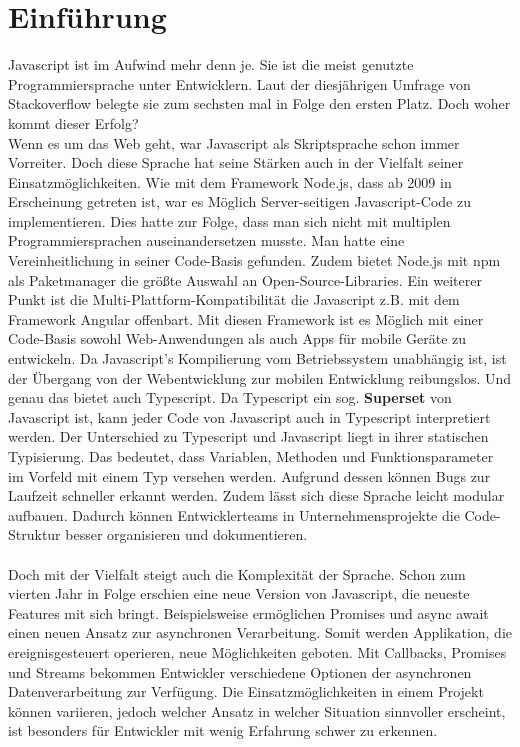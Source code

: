 \setcounter{secnumdepth}{1}

\section{Einführung}

Javascript ist im Aufwind mehr denn je. Sie ist die meist genutzte Programmiersprache unter Entwicklern. Laut der diesjährigen Umfrage von Stackoverflow belegte sie zum sechsten mal in Folge den ersten Platz.\cite{programming-language-survey} Doch woher kommt dieser Erfolg? \\
Wenn es um das Web geht, war Javascript als Skriptsprache schon immer Vorreiter. Doch diese Sprache hat seine Stärken auch in der Vielfalt seiner Einsatzmöglichkeiten. Wie mit dem Framework Node.js, dass ab 2009 in Erscheinung getreten ist, war es Möglich Server-seitigen Javascript-Code zu implementieren. Dies hatte zur Folge, dass man sich nicht mit multiplen Programmiersprachen auseinandersetzen musste. Man hatte eine Vereinheitlichung in seiner Code-Basis gefunden. Zudem bietet Node.js mit npm als Paketmanager die größte Auswahl an Open-Source-Libraries. Ein weiterer Punkt ist die Multi-Plattform-Kompatibilität die Javascript z.B. mit dem Framework Angular offenbart. Mit diesen Framework ist es Möglich mit einer Code-Basis sowohl Web-Anwendungen als auch Apps für mobile Geräte zu entwickeln. Da Javascript's Kompilierung vom Betriebssystem unabhängig ist, ist der Übergang von der Webentwicklung zur mobilen Entwicklung reibungslos. Und genau das bietet auch Typescript. Da Typescript ein sog. \textbf{Superset} von Javascript ist, kann jeder Code von Javascript auch in Typescript interpretiert werden. Der Unterschied zu Typescript und Javascript liegt in ihrer statischen Typisierung. Das bedeutet, dass Variablen, Methoden und Funktionsparameter im Vorfeld mit einem Typ versehen werden. Aufgrund dessen können Bugs zur Laufzeit schneller erkannt werden. Zudem lässt sich diese Sprache leicht modular aufbauen. Dadurch können Entwicklerteams in Unternehmensprojekte die Code-Struktur besser organisieren und dokumentieren.\\\\

\noindent
Doch mit der Vielfalt steigt auch die Komplexität der Sprache. Schon zum vierten Jahr in Folge erschien eine neue Version von Javascript, die neueste Features mit sich bringt. Beispielsweise ermöglichen Promises und async await einen neuen Ansatz zur asynchronen Verarbeitung. Somit werden Applikation, die ereignisgesteuert operieren, neue Möglichkeiten geboten. Mit Callbacks, Promises und Streams bekommen Entwickler verschiedene Optionen der asynchronen Datenverarbeitung zur Verfügung. Die Einsatzmöglichkeiten in einem Projekt können variieren, jedoch welcher Ansatz in welcher Situation sinnvoller erscheint, ist besonders für Entwickler mit wenig Erfahrung schwer zu erkennen.

